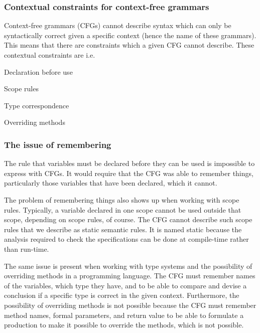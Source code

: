 \subsubsection{Contextual constraints for context-free grammars}
\label{sec:contextualconstraints}

Context-free grammars (CFGs) cannot describe syntax which can only be
syntactically correct given a specific context (hence the name of these
grammars). This means that there are constraints which a given CFG cannot
describe.
These contextual constraints are i.e.\:
\cite[p. 39]{plpp}

\begin{dlist}
\item Declaration before use
\item Scope rules
\item Type correspondence
\item Overriding methods
\end{dlist}


\subsubsection*{The issue of remembering}

The rule that variables must be declared before they can be used is impossible
to express with CFGs. It would require that the CFG was able to remember things,
particularly those variables that have been declared, which it cannot. 

The problem of remembering things also shows up when working with
scope rules. Typically, a variable declared in one scope cannot be
used outside that scope, depending on scope rules, of course. The CFG
cannot describe such scope rules that we describe as static semantic
rules. It is named static because the analysis required to check the
specifications can be done at compile-time rather than run-time.
\cite[p. 153]{sebesta2013}

The same issue is present when working with type systems and the
possibility of overriding methods in a programming language. The CFG
must remember names of the variables, which type they have, and to be
able to compare and devise a conclusion if a specific type is correct in
the given context. Furthermore, the possibility of overriding methods
is not possible because the CFG must remember method names, formal
parameters, and return value to be able to formulate a production to
make it possible to override the methods, which is not possible.

